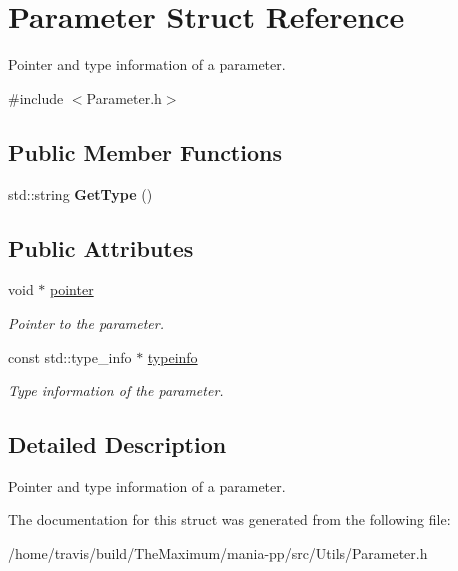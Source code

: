 \hypertarget{structParameter}{\section{Parameter Struct Reference}
\label{structParameter}
}


Pointer and type information of a parameter.  




{\ttfamily \#include $<$Parameter.\-h$>$}

\subsection*{Public Member Functions}
\begin{DoxyCompactItemize}
\item 
\hypertarget{structParameter_acbaa165bda6b087c2e99fdb8925a7d89}{std\-::string {\bfseries Get\-Type} ()}\label{structParameter_acbaa165bda6b087c2e99fdb8925a7d89}

\end{DoxyCompactItemize}
\subsection*{Public Attributes}
\begin{DoxyCompactItemize}
\item 
\hypertarget{structParameter_ab93b3e7a68feb86fe5a1d1734d125e7e}{void $\ast$ \hyperlink{structParameter_ab93b3e7a68feb86fe5a1d1734d125e7e}{pointer}}\label{structParameter_ab93b3e7a68feb86fe5a1d1734d125e7e}

\begin{DoxyCompactList}\small\item\em Pointer to the parameter. \end{DoxyCompactList}\item 
\hypertarget{structParameter_a9f8602d10b3c497bde219c4e6a8b1b60}{const std\-::type\-\_\-info $\ast$ \hyperlink{structParameter_a9f8602d10b3c497bde219c4e6a8b1b60}{typeinfo}}\label{structParameter_a9f8602d10b3c497bde219c4e6a8b1b60}

\begin{DoxyCompactList}\small\item\em Type information of the parameter. \end{DoxyCompactList}\end{DoxyCompactItemize}


\subsection{Detailed Description}
Pointer and type information of a parameter. 

The documentation for this struct was generated from the following file\-:\begin{DoxyCompactItemize}
\item 
/home/travis/build/\-The\-Maximum/mania-\/pp/src/\-Utils/Parameter.\-h\end{DoxyCompactItemize}
